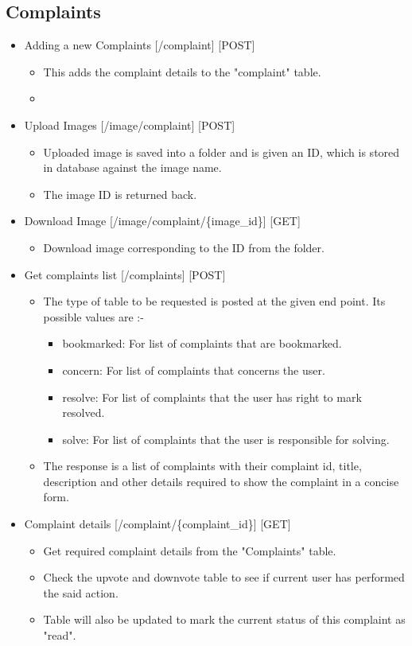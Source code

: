 \documentclass[12pt]{article}
\begin{document}
\subsection{Complaints}
\begin{itemize}
\setlength\itemsep{-0.4em}
\item Adding a new Complaints [/complaint] [POST]
\begin{itemize}
\setlength\itemsep{-0.4em}
\item This adds the complaint details to the "complaint" table.
\item 
\end{itemize}
\item Upload Images [/image/complaint] [POST]
\begin{itemize}
\setlength\itemsep{-0.4em}
\item Uploaded image is saved into a folder and is given an ID, which is stored in database against the image name.
\item The image ID is returned back.
\end{itemize}
\item Download Image [/image/complaint/\{image\_id\}] [GET]
\begin{itemize}
\setlength\itemsep{-0.4em}
\item Download image corresponding to the ID from the folder.
\end{itemize}
\item Get complaints list [/complaints] [POST]
\begin{itemize}
\setlength\itemsep{-0.4em}
\item The type of table to be requested is posted at the given end point. Its possible values are :-
\begin{itemize}
\setlength\itemsep{-0.4em}
\item bookmarked: For list of complaints that are bookmarked.
\item concern: For list of complaints that concerns the user.
\item resolve: For list of complaints that the user has right to mark resolved.
\item solve: For list of complaints that the user is responsible for solving.
\end{itemize}
\item The response is a list of complaints with their complaint id, title, description and other details required to show the complaint in a concise form.
\end{itemize}
\item Complaint details [/complaint/\{complaint\_id\}] [GET]
\begin{itemize}
\setlength\itemsep{-0.4em}
\item Get required complaint details from the "Complaints" table.
\item Check the upvote and downvote table to see if current user has performed the said action.
\item Table will also be updated to mark the current status of this complaint as "read".
\end{itemize}
\end{itemize}
\end{document}
